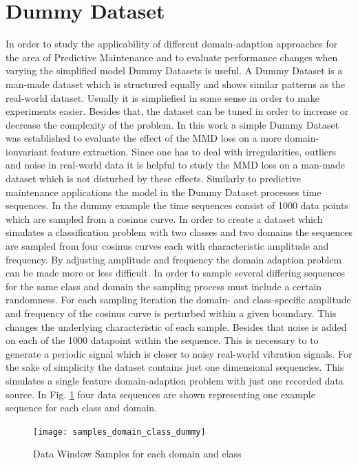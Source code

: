 \section{Dummy Dataset}
In order to study the applicability of different domain-adaption approaches for the area of Predictive Maintenance and to evaluate performance changes when varying the simplified model Dummy Datasets is useful. A Dummy Dataset is a man-made dataset which is structured equally and shows similar patterns as the real-world dataset. Usually it is simpliefied in some sense in order to make experiments easier. Besides that, the dataset can be tuned in order to increase or decrease the complexity of the problem. 
In this work a simple Dummy Dataset was established to evaluate the effect of the MMD loss on a more domain-ionvariant feature extraction. Since one has to deal with irregularities, outliers and noise in real-world data it is helpful to study the MMD loss on a man-made dataset which is not disturbed by these effects. Similarly to predictive maintenance applications the model in the Dummy Dataset processes time sequences. In the dummy example the time sequences consist of 1000 data points which are sampled from a cosinus curve. In order to create a dataset which simulates a classification problem with two classes and two domains the sequences are sampled from four cosinus curves each with characteristic amplitude and frequency. By adjusting amplitude and frequency the domain adaption problem can be made more or less difficult. In order to sample several differing sequences for the same class and domain the sampling process must include a certain randomness. For each sampling iteration the domain- and class-specific amplitude and frequency of the cosinus curve is perturbed within a given boundary. This changes the underlying characteristic of each sample. Besides that noise is added on each of the 1000 datapoint within the sequence. This is necessary to to generate a periodic signal which is closer to noisy real-world vibration signals. For the sake of simplicity the dataset contains just one dimensional sequencies. This simulates a single feature domain-adaption problem with just one recorded data source. In Fig. \ref{fig:samples_domain_class_dummy} four data sequences are shown representing one example sequence for each class and domain. 

\begin{figure}[htpb]
  \centering
  \texttt{[image: samples\_domain\_class\_dummy]}
  \caption {Data Window Samples for each domain and class}
  \label{fig:samples_domain_class_dummy}
\end{figure}

